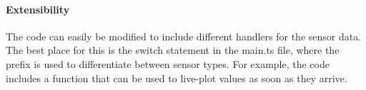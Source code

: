 \paragraph{Extensibility}
The code can easily be modified to include different handlers for the sensor data.
The best place for this is the switch statement in the main.ts file, where the prefix is used to differentiate between sensor types.
For example, the code includes a function that can be used to live-plot values as soon as they arrive.